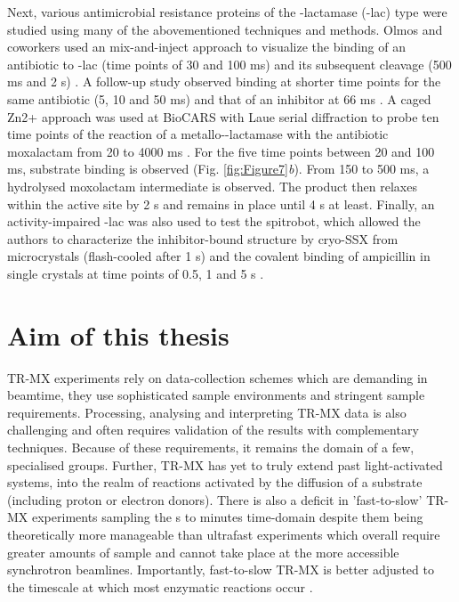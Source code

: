Next, various antimicrobial resistance proteins of the \textBeta-lactamase (\textBeta-lac) type were studied using many of the abovementioned techniques and methods. Olmos and coworkers used an mix-and-inject approach to visualize the binding of an antibiotic to \textBeta-lac (time points of 30 and 100 ms) and its subsequent cleavage (500 ms and 2 s) \parencite{olmosEnzymeIntermediatesCaptured2018}. A follow-up study observed binding at shorter time points for the same antibiotic (5, 10 and 50 ms) and that of an inhibitor at 66 ms \parencite{pandeyObservationSubstrateDiffusion2021}. A caged Zn2+ approach was used at BioCARS with Laue serial diffraction to probe ten time points of the reaction of a metallo-\textBeta-lactamase with the antibiotic moxalactam from 20 to 4000 ms \parencite{wilamowskiTimeresolvedVlactamCleavage2022}. For the five time points between 20 and 100 ms, substrate binding is observed (Fig. \ref{fig:Figure7}\textit{b}). From 150 to 500 ms, a hydrolysed moxolactam intermediate is observed. The product then relaxes within the active site by 2 s and remains in place until 4 s at least. Finally, an activity-impaired \textBeta-lac was also used to test the spitrobot, which allowed the authors to characterize the inhibitor-bound structure by cryo-SSX from microcrystals (flash-cooled after 1 s) and the covalent binding of ampicillin in single crystals at time points of 0.5, 1 and 5 s \parencite{mehrabiMillisecondCryotrappingSpitrobot2023}.

\section{Aim of this thesis}

TR-MX experiments rely on data-collection schemes which are demanding in beamtime, they use sophisticated sample environments and stringent sample requirements. Processing, analysing and interpreting TR-MX data is also challenging and often requires validation of the results with complementary techniques. Because of these requirements, it remains the domain of a few, specialised groups. Further, TR-MX has yet to truly extend past light-activated systems, into the realm of reactions activated by the diffusion of a substrate (including proton or electron donors). There is also a deficit in 'fast-to-slow' TR-MX experiments sampling the \textmu s to minutes time-domain despite them being theoretically more manageable than ultrafast experiments which overall require greater amounts of sample and cannot take place at the more accessible synchrotron beamlines. Importantly, fast-to-slow TR-MX is better adjusted to the timescale at which most enzymatic reactions occur \parencite{bar-evenModeratelyEfficientEnzyme2011}.

